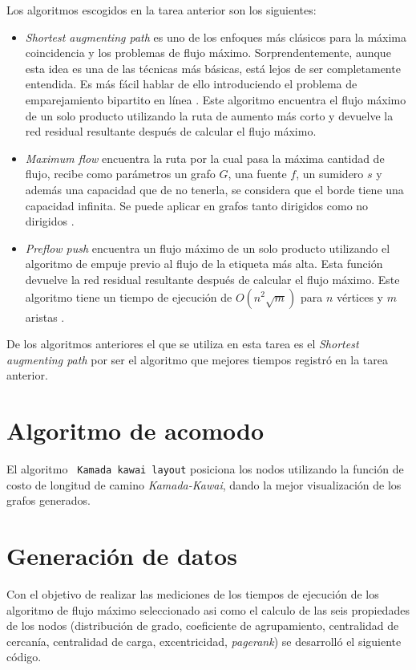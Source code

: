\documentclass{article}
\begin{document}
Los algoritmos escogidos en la tarea anterior son los siguientes:
\begin{itemize}
  \item\textit{Shortest augmenting path} es uno de los enfoques más clásicos para la máxima coincidencia y los problemas de flujo máximo. Sorprendentemente, aunque esta idea es una de las técnicas más básicas, está lejos de ser completamente entendida. Es más fácil hablar de ello introduciendo el problema de emparejamiento bipartito en línea \cite{Bosek2018}. Este algoritmo encuentra el flujo máximo de un solo producto utilizando la ruta de aumento más corto y devuelve la red residual resultante después de calcular el flujo máximo.   
   \item\textit{Maximum flow} encuentra la ruta por la cual pasa la máxima cantidad de flujo, recibe como parámetros un grafo $G$, una fuente $f$, un sumidero $s$ y además una capacidad que de no tenerla, se considera que el borde tiene una capacidad infinita. Se puede aplicar en grafos tanto dirigidos como no dirigidos \cite{mf}.
	\item\textit{Preflow push} encuentra un flujo máximo de un solo producto utilizando el algoritmo de empuje previo al flujo de la etiqueta más alta. Esta función devuelve la red residual resultante después de calcular el flujo máximo. Este algoritmo tiene un tiempo de ejecución de $ O(n^{2}\sqrt{m})$ para $n$ vértices y $m$ aristas \cite{gc}.
\end{itemize}

De los algoritmos anteriores el que se utiliza en esta tarea es el \textit{Shortest augmenting path} por ser el algoritmo que mejores tiempos registró en la tarea anterior.

\section{Algoritmo de acomodo}

El algoritmo \texttt{ Kamada kawai layout} posiciona los nodos utilizando la función de costo de longitud de camino \textit{Kamada-Kawai}, dando la mejor visualización de los grafos generados.

\section{Generación de datos}
Con el objetivo de realizar las mediciones de los tiempos de ejecución de los algoritmo de flujo máximo seleccionado asi como el calculo de las seis propiedades de los nodos (distribución de grado, coeficiente de agrupamiento, centralidad de cercanía, centralidad de carga, excentricidad, \textit{pagerank}) se desarrolló el siguiente código.
\end{document}
